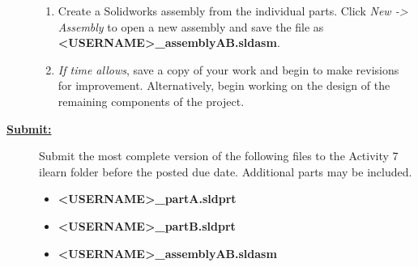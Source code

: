 \documentclass[12pt]{article}
\newcommand{\ANUM}{7} %
\begin{document}
\begin{description}
\begin{enumerate}
	\item Create a Solidworks assembly from the individual parts. Click {\it New -> Assembly} to open a new assembly and save the file as {\bf \BL<USERNAME>\BK\_assemblyAB.sldasm}. 
	\item {\it If time allows}, save a copy of your work and begin to make revisions for improvement. Alternatively, begin working on the design of the remaining components of the project. 
\end{enumerate}

\item[\textbf{\underline{Submit:}}] \hfill \vspace{0mm}

		Submit the most complete version of the following files to the Activity \ANUM \hspace{1mm} ilearn folder before the posted due date. Additional parts may be included.
		\begin{itemize}
			\item {\bf \BL<USERNAME>\BK\_partA.sldprt}
			\item {\bf \BL<USERNAME>\BK\_partB.sldprt}
			\item {\bf \BL<USERNAME>\BK\_assemblyAB.sldasm}
			
		\end{itemize}  

\end{description}
\end{document}
